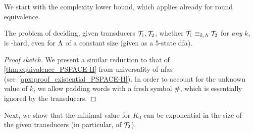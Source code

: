 We start with the complexity lower bound, which applies already for round equivalence.

\begin{theorem}
\label{thm:existential_equivalence_PSPACE-H}
The problem of deciding, given transducers $\mathcal{T}_1,\mathcal{T}_2$, whether $\mathcal{T}_1\equiv_{k,\Lambda} \mathcal{T}_2$ for \emph{any} $k$, is \PSPACE-hard, even for $\Lambda$ of a constant size (given as a 5-state \gls{dfa}).
\end{theorem}
\begin{proof}[Proof sketch]
We present a similar reduction to that of \autoref{thm:equivalence_PSPACE-H} from universality of \glspl{nfa} (see~\autoref{apx:proof_existential_PSPACE-H}). In order to account for the unknown value of $k$, we allow padding words with a fresh symbol $\#$, which is essentially ignored by the transducers. 
\end{proof}

Next, we show that the minimal value for $K_0$ can be exponential in the size of the given transducers (in particular, of $\mathcal{T}_2$).

